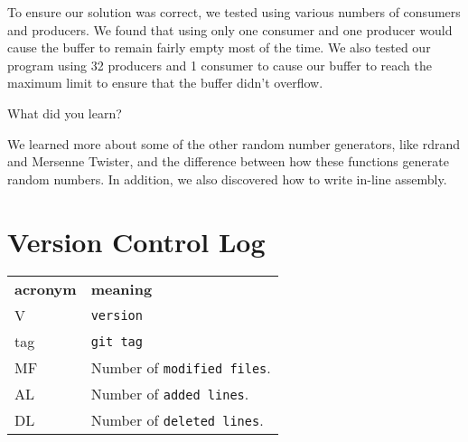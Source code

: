 \documentclass[10pt,a4paper,english]{article}
\newenvironment{question}[2][Question]	{\begin{trivlist}
\item[\hskip \labelsep {\bfseries #1}\hskip \labelsep {\bfseries #2.}]}
{\end{trivlist}} %
\begin{document}
To ensure our solution was correct, we tested using various numbers of consumers and producers. We found that using only one consumer and one producer would cause the buffer to remain fairly empty most of the time. We also tested our program using 32 producers and 1 consumer to cause our buffer to reach the maximum limit to ensure that the buffer didn't overflow.

\begin{question}{4}
What did you learn?
\end{question}

We learned more about some of the other random number generators, like rdrand and Mersenne Twister, and the difference between how these functions generate random numbers. In addition, we also discovered how to write in-line assembly. 

\section{Version Control Log}

\begin{tabular}{lp{12cm}}
  \label{tabular:legend:git-log}
  \textbf{acronym} & \textbf{meaning} \\
  V & \texttt{version} \\
  tag & \texttt{git tag} \\
  MF & Number of \texttt{modified files}. \\
  AL & Number of \texttt{added lines}. \\
  DL & Number of \texttt{deleted lines}. \\
\end{tabular}

\bigskip
\end{document}
